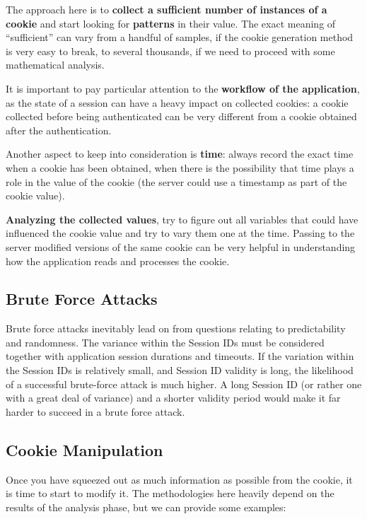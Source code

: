 			The approach here is to {\bf collect a sufficient number of instances of a cookie} and 
			start looking for {\bf patterns} in their value. The exact meaning of “sufficient” can vary 
			from a handful of samples, if the cookie generation method is very easy to break, to
			several thousands, if we need to proceed with some mathematical analysis.

			It is important to pay particular attention to the {\bf workflow of the application}, 
			as the state of a session can have a heavy impact on collected cookies: a cookie 
			collected before being authenticated can be very different from a cookie obtained
			after the authentication.

			Another aspect to keep into consideration is {\bf time}: always record the exact time 
			when a cookie has been obtained, when there is the possibility that time plays a role 
			in the value of the cookie (the server could use a timestamp as part of the
			cookie value).

			{\bf Analyzing the collected values}, try to figure out all variables that could have 
			influenced  the cookie value and try to vary them one at the time. Passing to the server 
			modified versions of the same cookie can be very helpful in understanding how the 
			application reads and processes the cookie.

		\subsection{Brute Force Attacks}
			Brute force attacks inevitably lead on from questions relating to predictability and 
			randomness. The variance within the Session IDs must be considered together with 
			application session durations and timeouts. If the variation within the Session
			IDs is relatively small, and Session ID validity is long, the likelihood of a successful 
			brute-force attack is much higher. A long Session ID (or rather one with a great deal 
			of variance) and a shorter validity period would make it far harder to succeed in a
			brute force attack.

		\clearpage
		\subsection{Cookie Manipulation}
			Once you have squeezed out as much information as possible from the cookie, it is 
			time to start to modify it. The methodologies here heavily depend on the results 
			of the analysis phase, but we can provide some examples:

